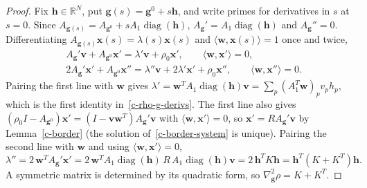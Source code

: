 \documentclass[11pt]{article}
\theoremstyle{plain}
\theoremstyle{remark}
\numberwithin{equation}{section}
\begin{document}
\begin{proof}
Fix $\bm h\in\mathbb{R}^N$, put $\bm g(s)=\bm g^0+s\bm h$, and write primes
for derivatives in $s$ at $s=0$. Since $A_{\bm g(s)}=A_{\bm g^0}+sA_1\operatorname{diag}(\bm h)$,
$A_{\bm g}'=A_1\operatorname{diag}(\bm h)$ and $A_{\bm g}''=0$. Differentiating
$A_{\bm g(s)}\bm x(s)=\lambda(s)\bm x(s)$ and $\langle\bm w,\bm x(s)\rangle=1$ once and
twice,
\begin{align*}
&A_{\bm g}'\bm v+A_{\bm g^0}\bm x'=\lambda'\bm v+\rho_0\bm x',\qquad \langle\bm w,\bm x'\rangle=0,\\
&2A_{\bm g}'\bm x'+A_{\bm g^0}\bm x''=\lambda''\bm v+2\lambda'\bm x'+\rho_0\bm x'',\qquad
\langle\bm w,\bm x''\rangle=0 .
\end{align*}
Pairing the first line with $\bm w$ gives
$\lambda'=\bm w^TA_1\operatorname{diag}(\bm h)\bm v=\sum_p\left(A_1^T\bm w\right)_pv_ph_p$,
which is the first identity in~\eqref{c-rho-g-derivs}. The first line also
gives $(\rho_0I-A_{\bm g^0})\bm x'=\left(I-\bm v\bm w^T\right)A_{\bm g}'\bm v$ with
$\langle\bm w,\bm x'\rangle=0$, so $\bm x'=RA_{\bm g}'\bm v$ by Lemma~\ref{c-border}
(the solution of~\eqref{c-border-system} is unique). Pairing the second line
with $\bm w$ and using $\langle\bm w,\bm x'\rangle=0$,
\begin{equation*}
\lambda''=2\,\bm w^TA_{\bm g}'\bm x'=2\,\bm w^TA_1\operatorname{diag}(\bm h)\,R\,A_1\operatorname{diag}(\bm h)\bm v
=2\,\bm h^TK\bm h=\bm h^T\left(K+K^T\right)\bm h .
\end{equation*}
A symmetric matrix is determined by its quadratic form, so
$\nabla^2_{\bm g}\rho=K+K^T$.
\end{proof}
\end{document}
